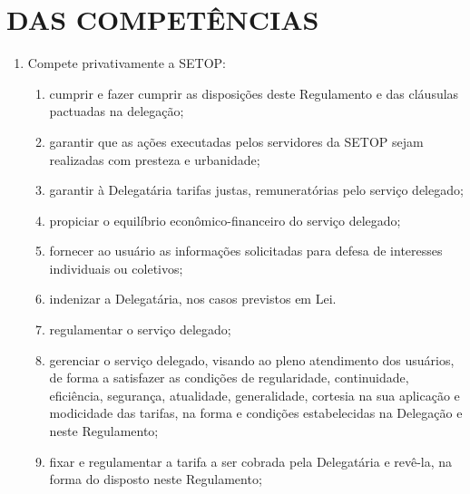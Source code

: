 \chapter{DAS COMPETÊNCIAS}

\begin{enumerate}[resume, label=Art. \arabic*]

\section{Das Competências da Secretaria de Estado de Transporte e Obras Públicas}

\item Compete privativamente a SETOP:

\begin{enumerate}[label=\roman*.]

\item cumprir e fazer cumprir as disposições deste Regulamento e das cláusulas pactuadas na delegação;

\item garantir que as ações executadas pelos servidores da SETOP sejam realizadas com presteza e urbanidade;

\item garantir à Delegatária tarifas justas, remuneratórias pelo serviço delegado;

\item propiciar o equilíbrio econômico-financeiro do serviço delegado;

\item fornecer ao usuário as informações solicitadas para defesa de interesses individuais ou coletivos;

\item indenizar a Delegatária, nos casos previstos em Lei.

\item regulamentar o serviço delegado;

\item gerenciar o serviço delegado, visando ao pleno atendimento dos usuários, de forma a satisfazer as condições de regularidade, continuidade, eficiência, segurança, atualidade, generalidade, cortesia na sua aplicação e modicidade das tarifas, na forma e condições estabelecidas na Delegação e neste Regulamento;

\item fixar e regulamentar a tarifa a ser cobrada pela Delegatária e revê-la, na forma do disposto neste Regulamento;


\end{enumerate}
\end{enumerate}
